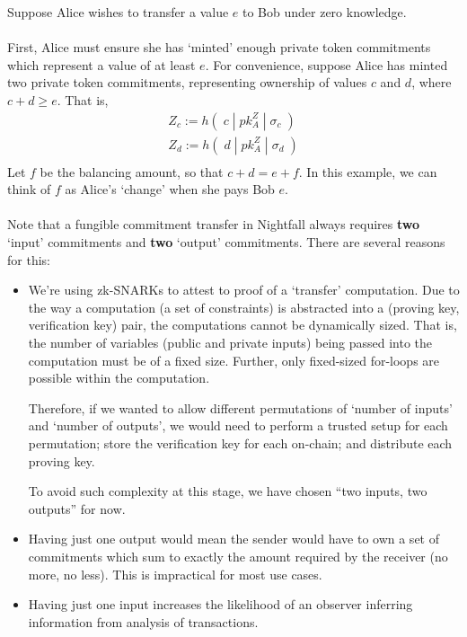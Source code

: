 Suppose Alice wishes to transfer a value $e$ to Bob under zero knowledge.\\
\\
First, Alice must ensure she has `minted' enough private token commitments which represent a value of at least $e$.
For convenience, suppose Alice has minted two private token commitments, representing ownership of values $c$ and $d$, where $c+d \geq e$. That is, 
\begin{align*}
  Z_c := h(\;c\;|\;pk^Z_A\;|\;\sigma_c\;)\\
  Z_d := h(\;d\;|\;pk^Z_A\;|\;\sigma_d\;)\\
\end{align*}
Let $f$ be the balancing amount, so that $c+d = e+f$. In this example, we can think of $f$ as Alice's `change' when she pays Bob $e$.\\
\\
Note that a fungible commitment transfer in Nightfall always requires \textbf{two} `input' commitments and \textbf{two} `output' commitments. There are several reasons for this:
\begin{itemize}
  \item We're using zk-SNARKs to attest to proof of a `transfer' computation. Due to the way a computation (a set of constraints) is abstracted into a (proving key, verification key) pair, the computations cannot be dynamically sized. That is, the number of variables (public and private inputs) being passed into the computation must be of a fixed size. Further, only fixed-sized for-loops are possible within the computation.
  
  Therefore, if we wanted to allow different permutations of `number of inputs' and `number of outputs', we would need to perform a trusted setup for each permutation; store the verification key for each on-chain; and distribute each proving key.

  To avoid such complexity at this stage, we have chosen ``two inputs, two outputs'' for now.

  \item Having just one output would mean the sender would have to own a set of commitments which sum to exactly the amount required by the receiver (no more, no less). This is impractical for most use cases.
  \item Having just one input increases the likelihood of an observer inferring information from analysis of transactions.
\end{itemize}
\ \\

